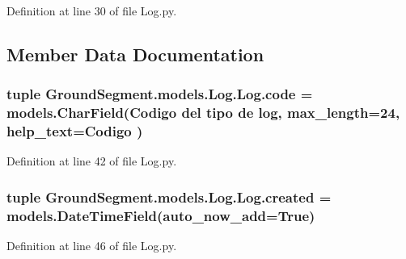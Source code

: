 Definition at line 30 of file Log.\+py.



\subsection{Member Data Documentation}
\hypertarget{class_ground_segment_1_1models_1_1_log_1_1_log_ae8de250667b9b871ac02617cae717eef}{}
\subsubsection[{code}]{\setlength{\rightskip}{0pt plus 5cm}tuple Ground\+Segment.\+models.\+Log.\+Log.\+code = models.\+Char\+Field(\textquotesingle{}Codigo del tipo de log\textquotesingle{}, max\+\_\+length=24, help\+\_\+text=\textquotesingle{}Codigo\textquotesingle{} )\hspace{0.3cm}{\ttfamily [static]}}\label{class_ground_segment_1_1models_1_1_log_1_1_log_ae8de250667b9b871ac02617cae717eef}


Definition at line 42 of file Log.\+py.

\hypertarget{class_ground_segment_1_1models_1_1_log_1_1_log_acb07a0dee966edc415ff1e5edd2d44cb}{}
\subsubsection[{created}]{\setlength{\rightskip}{0pt plus 5cm}tuple Ground\+Segment.\+models.\+Log.\+Log.\+created = models.\+Date\+Time\+Field(auto\+\_\+now\+\_\+add=True)\hspace{0.3cm}{\ttfamily [static]}}\label{class_ground_segment_1_1models_1_1_log_1_1_log_acb07a0dee966edc415ff1e5edd2d44cb}


Definition at line 46 of file Log.\+py.

\hypertarget{class_ground_segment_1_1models_1_1_log_1_1_log_aec39855e51031089ade633107205980c}{}
